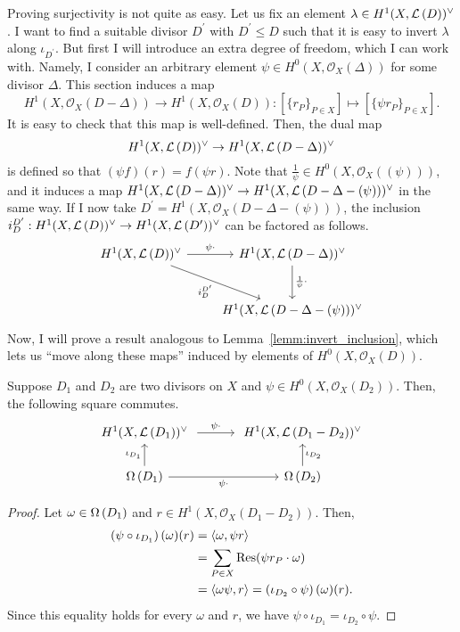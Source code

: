 Proving surjectivity is not quite as easy. Let us fix an element $\lambda
\in H^1(X,\mathcal{L}\left(D\right))^{\vee}$. I want to find a suitable divisor $D^{\prime}$ with
$D^{\prime}\leq D$ such that it is easy to invert $\lambda$ along
$\iota_{D^{\prime}}$. But first I will introduce an extra degree of freedom,
which I can work with. Namely, I consider an arbitrary element $\psi\in
H^{0}(X,\mathscr{O}_X(\Delta))$ for some divisor $\Delta$. This section induces
a map
\[H^{1}(X,\mathscr{O}_X(D-\Delta))\to H^{1}(X,\mathscr{O}_X(D))
:[\{r_{P}\}_{P\in X}]\mapsto [\{\psi r_{P}\}_{P\in X}].\]
It is easy to check that this map is well-defined. Then, the dual map
\[H^1(X,\mathcal{L}\left(D\right))^{\vee}\to H^1(X,\mathcal{L}\left(D-\Delta\right))^{\vee}\]
is defined so that $(\psi f)(r) =f(\psi r)$. Note that $\frac1{\psi}
\in H^{0}(X,\mathscr{O}_X((\psi)))$,
and it induces a map $H^1(X,\mathcal{L}\left(D-\Delta\right))^{\vee}\to H^1(X,\mathcal{L}\left(D-\Delta-(\psi)\right))^{\vee}$ in the same
way. If I now take $D^{\prime}=H^{1}(X,\mathscr{O}_X(D-\Delta-(\psi)))$,
the inclusion $i_{D}^{D^{\prime}}:H^1(X,\mathcal{L}\left(D\right))^{\vee}\to H^1(X,\mathcal{L}\left(D^{\prime}\right))^{\vee}$ can be
factored as follows.
\[\begin{tikzcd}[row sep=large]
    \dual{D}\rar["\psi\cdot"]\drar["i_{D}^{D^{\prime}}"']
    & \dual{D-\Delta}\dar["\frac1{\psi}\cdot"] \\ & \dual{D-\Delta-(\psi)}
  \end{tikzcd}\]
Now, I will prove a result analogous to Lemma~\ref{lemm:invert_inclusion},
which lets us ``move along these maps'' induced by elements of
$H^{0}(X,\mathscr{O}_X(D))$.
\begin{lemm}\label{lemm:invert_multiplication}
  Suppose $D_{1}$ and $D_{2}$ are two divisors on $X$ and $\psi
  \in H^{0}(X,\mathscr{O}_X(D_{2}))$. Then, the following square commutes.
  \[\begin{tikzcd}[column sep=large]
      \dual{D_{1}}\rar[shorten=.3em,"\psi\cdot"] & \dual{D_{1}-D_{2}} \\
      \diffs{D_{1}}\rar["\psi\cdot"']\uar["\iota_{D_{1}}"]
      & \diffs{D_{2}}\uar["\iota_{D_{2}}"']
    \end{tikzcd}\]
\end{lemm}
\begin{proof}
  Let $\omega\in\Omega\left(D_{1}\right)$ and $r\in H^{1}(X,\mathscr{O}_X(D_{1}-D_{2}))$.
  Then,
  \begin{align*}
    \left(\psi\circ\iota_{D_{1}}\right)(\omega)(r)
    &= \langle \omega, \psi r\rangle \\
    &= \sum_{P\in X}\operatorname{Res}(\psi r_{P}\cdot\omega) \\
    &= \langle \omega\psi, r\rangle=\left(\iota_{D_{2}}\circ\psi\right)
      (\omega)(r).
  \end{align*}
  Since this equality holds for every $\omega$ and $r$, we have
  $\psi\circ\iota_{D_{1}}=\iota_{D_{2}}\circ\psi$.
\end{proof}

